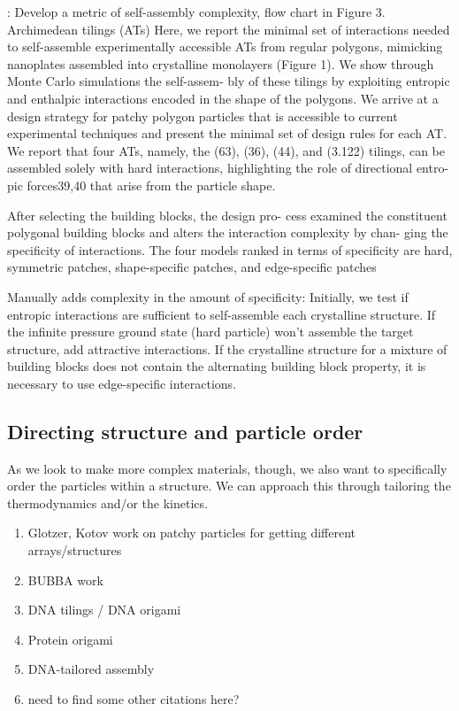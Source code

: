 \cite{Millan_2014_ACSNano}:
Develop a metric of self-assembly complexity, flow chart in Figure 3.
Archimedean tilings (ATs)
Here, we report the minimal set of interactions needed to self-assemble experimentally accessible ATs from regular polygons, mimicking nanoplates assembled into crystalline monolayers (Figure 1). We show through Monte Carlo simulations the self-assem- bly of these tilings by exploiting entropic and enthalpic interactions encoded in the shape of the polygons. We arrive at a design strategy for patchy polygon particles that is accessible to current experimental techniques and present the minimal set of design rules for each AT. We report that four ATs, namely, the (63), (36), (44), and (3.122) tilings, can be assembled solely with hard interactions, highlighting the role of directional entro- pic forces39,40 that arise from the particle shape.

After selecting the building blocks, the design pro- cess examined the constituent polygonal building blocks and alters the interaction complexity by chan- ging the specificity of interactions. The four models ranked in terms of specificity are hard, symmetric patches, shape-specific patches, and edge-specific patches

Manually adds complexity in the amount of specificity:
Initially, we test if entropic interactions are sufficient to self-assemble each crystalline structure. If the infinite pressure ground state (hard particle) won't assemble the target structure, add attractive interactions. If the crystalline structure for a mixture of building blocks does not contain the alternating building block property, it is necessary to use edge-specific interactions.


\subsection{Directing structure and particle order}
As we look to make more complex materials, though, we also want to specifically order the particles within a structure.
We can approach this through tailoring the thermodynamics and/or the kinetics.

\begin{enumerate}
\item Glotzer, Kotov work on patchy particles for getting different arrays/structures
\item BUBBA work
\item DNA tilings / DNA origami
\item Protein origami
\item DNA-tailored assembly
\item need to find some other citations here?
\end{enumerate}

